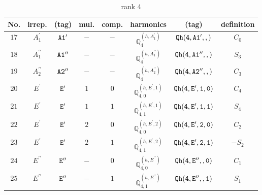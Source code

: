 \documentclass[fleqn,8pt]{jsarticle}
\begin{document}
\begin{table}[ht!]
\begin{center}
\caption{rank 4}
\renewcommand{\arraystretch}{1.3}
\begin{tabular}{cccccccc} \hline \hline
No. & irrep. & (tag) & mul. & comp. & harmonics & (tag) & definition \\ \hline
$ 17 $ & $ A_{1}^{\prime} $ & $ {\tt A1'} $ & $ - $ & $ - $ & $ \mathbb{Q}_{4}^{(h,A_{1}^{\prime})} $ & $ {\tt Qh(4,A1',,)} $ & $ C_{0} $ \\
$ 18 $ & $ A_{1}^{\prime\prime} $ & $ {\tt A1''} $ & $ - $ & $ - $ & $ \mathbb{Q}_{4}^{(h,A_{1}^{\prime\prime})} $ & $ {\tt Qh(4,A1'',,)} $ & $ S_{3} $ \\
$ 19 $ & $ A_{2}^{\prime\prime} $ & $ {\tt A2''} $ & $ - $ & $ - $ & $ \mathbb{Q}_{4}^{(h,A_{2}^{\prime\prime})} $ & $ {\tt Qh(4,A2'',,)} $ & $ C_{3} $ \\
$ 20 $ & $ E^{\prime} $ & $ {\tt E'} $ & $ 1 $ & $ 0 $ & $ \mathbb{Q}_{4,0}^{(h,E^{\prime},1)} $ & $ {\tt Qh(4,E',1,0)} $ & $ C_{4} $ \\
$ 21 $ & $ E^{\prime} $ & $ {\tt E'} $ & $ 1 $ & $ 1 $ & $ \mathbb{Q}_{4,1}^{(h,E^{\prime},1)} $ & $ {\tt Qh(4,E',1,1)} $ & $ S_{4} $ \\
$ 22 $ & $ E^{\prime} $ & $ {\tt E'} $ & $ 2 $ & $ 0 $ & $ \mathbb{Q}_{4,0}^{(h,E^{\prime},2)} $ & $ {\tt Qh(4,E',2,0)} $ & $ C_{2} $ \\
$ 23 $ & $ E^{\prime} $ & $ {\tt E'} $ & $ 2 $ & $ 1 $ & $ \mathbb{Q}_{4,1}^{(h,E^{\prime},2)} $ & $ {\tt Qh(4,E',2,1)} $ & $ - S_{2} $ \\
$ 24 $ & $ E^{\prime\prime} $ & $ {\tt E''} $ & $ - $ & $ 0 $ & $ \mathbb{Q}_{4,0}^{(h,E^{\prime\prime})} $ & $ {\tt Qh(4,E'',,0)} $ & $ C_{1} $ \\
$ 25 $ & $ E^{\prime\prime} $ & $ {\tt E''} $ & $ - $ & $ 1 $ & $ \mathbb{Q}_{4,1}^{(h,E^{\prime\prime})} $ & $ {\tt Qh(4,E'',,1)} $ & $ S_{1} $ \\
 \hline \hline
\end{tabular}
\end{center}
\end{table}
\end{document}
